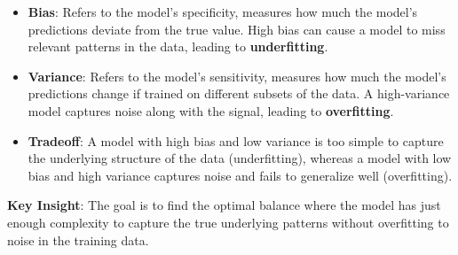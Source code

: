 \begin{itemize}
	\item \textbf{Bias}: Refers to the model's specificity, measures how much the model's predictions deviate from the true value. High bias can cause a model to miss relevant patterns in the data, leading to \textbf{underfitting}.

	\item \textbf{Variance}: Refers to the model's sensitivity, measures how much the model's predictions change if trained on different subsets of the data. A high-variance model captures noise along with the signal, leading to \textbf{overfitting}.

	\item \textbf{Tradeoff}: A model with high bias and low variance is too simple to capture the underlying structure of the data (underfitting), whereas a model with low bias and high variance captures noise and fails to generalize well (overfitting).
\end{itemize}

\textbf{Key Insight}: The goal is to find the optimal balance where the model has just enough complexity to capture the true underlying patterns without overfitting to noise in the training data.
